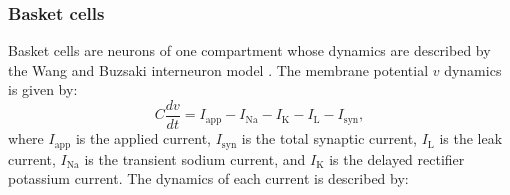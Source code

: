 \documentclass[../main.tex]{subfiles}
\begin{document}
\subsubsection{Basket cells}
Basket cells are neurons of one compartment whose dynamics are described by the Wang and Buzsaki interneuron model \citep{neymotin_ketamine_2011,neymotin_ih_2013,Tort2007,Wang1996}.
The membrane potential $v$ dynamics is given by:
\begin{equation}
    C\displaystyle\frac{dv}{dt} = I_{\text{app}}-I_{\text{Na}} - I_{\text{K}} - I_{\text{L}} - I_{\text{syn}},
    \label{eq:basket-dynamics}
\end{equation}
where $I_{\text{app}}$ is the applied current, $I_{\text{syn}}$ is the total synaptic current, $I_{\text{L}}$ is the leak current, $I_{\text{Na}}$ is the transient sodium current, and $I_{\text{K}}$ is the delayed rectifier potassium current. 
The dynamics of each current is described by:
\end{document}
